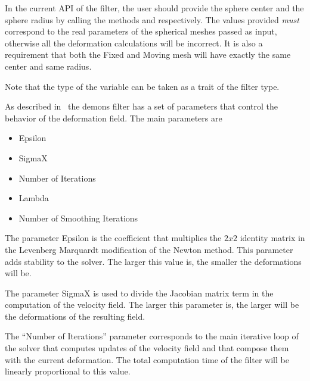 \documentclass{InsightArticle}
\begin{document}
In the current API of the filter, the user should provide the sphere center and
the sphere radius by calling the methods  and
 respectively. The values provided \emph{must} correspond to
the real parameters of the spherical meshes passed as input, otherwise all the
deformation calculations will be incorrect. It is also a requirement that both
the Fixed and Moving mesh will have exactly the same center and same radius.

\begin{center}

\end{center}

Note that the type of the  variable can be taken as a trait of the
filter type.
 
\begin{center}

\end{center}

As described in~\cite{Yeo2008,Yeo2009} the demons filter has a set of
parameters that control the behavior of the deformation field. The main
parameters are

\begin{itemize}
\item Epsilon
\item SigmaX
\item Number of Iterations
\item Lambda
\item Number of Smoothing Iterations
\end{itemize}

The parameter Epsilon is the coefficient that multiplies the $2x2$ identity
matrix in the Levenberg Marquardt modification of the Newton method. This
parameter adds stability to the solver. The larger this value is, the smaller
the deformations will be.

The parameter SigmaX is used to divide the Jacobian matrix term in the
computation of the velocity field. The larger this parameter is, the larger
will be the deformations of the resulting field.

The ``Number of Iterations'' parameter corresponds to the main iterative loop
of the solver that computes updates of the velocity field and that compose them
with the current deformation. The total computation time of the filter will be
linearly proportional to this value.
\end{document}
